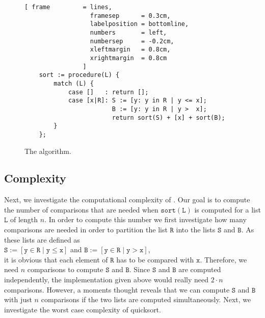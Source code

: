 \begin{figure}[!ht]
  \centering
\begin{Verbatim}[ frame         = lines, 
                  framesep      = 0.3cm, 
                  labelposition = bottomline,
                  numbers       = left,
                  numbersep     = -0.2cm,
                  xleftmargin   = 0.8cm,
                  xrightmargin  = 0.8cm
                ]
    sort := procedure(L) {
        match (L) {
            case []   : return [];
            case [x|R]: S := [y: y in R | y <= x];
                        B := [y: y in R | y >  x];
                        return sort(S) + [x] + sort(B);
        }
    };
\end{Verbatim}
\vspace*{-0.3cm}
  \caption{The  algorithm.}
  \label{fig:quick-sort.stlx}
\end{figure}

\subsection{Complexity}
Next, we investigate the computational complexity of .
Our goal is to compute the number of comparisons that are needed when
$\mathtt{sort}(\mathtt{L})$ is computed for a list $\mathtt{L}$ of length $n$.  In order to compute this number we
first investigate how many comparisons are needed in order to partition the list $\mathtt{R}$
into the lists $\mathtt{S}$ and $\mathtt{B}$.  As these lists are defined as 
\\[0.2cm]
\hspace*{1.3cm}
 $\mathtt{S} := [\mathtt{y} \in \mathtt{R} \mid \mathtt{y} \leq \mathtt{x}]$ \quad and \quad
 $\mathtt{B} := [\mathtt{y} \in \mathtt{R} \mid \mathtt{y} > \mathtt{x}]$,
\\[0.2cm]
it is obvious that each element of $\mathtt{R}$ has to be compared with $\mathtt{x}$.
Therefore, we need $n$ comparisons to compute $\mathtt{S}$ and $\mathtt{B}$.  Since $\mathtt{S}$ and
$\mathtt{B}$ are computed independently, the implementation given above 
would really need $2 \cdot n$ comparisons.  However, a moments thought reveals that we can compute $\mathtt{S}$ and $\mathtt{B}$
with just $n$ comparisons if the two lists are computed simultaneously.
Next, we investigate the worst case complexity of quicksort.

